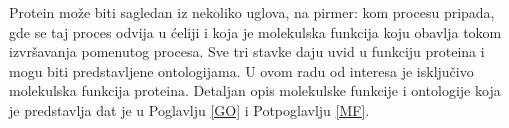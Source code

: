 Protein može biti sagledan iz nekoliko uglova, na pirmer: kom procesu pripada,
gde se taj proces odvija u ćeliji i koja je molekulska funkcija koju obavlja
tokom izvršavanja pomenutog procesa. Sve tri stavke daju uvid u funkciju
proteina i mogu biti predstavljene ontologijama. U ovom radu od interesa je
isključivo molekulska funkcija proteina.  Detaljan opis  molekulske funkcije i
ontologije koja je predstavlja dat je u Poglavlju \ref{GO} i Potpoglavlju
\ref{MF}.








%
%   
%
%
%



%
%
